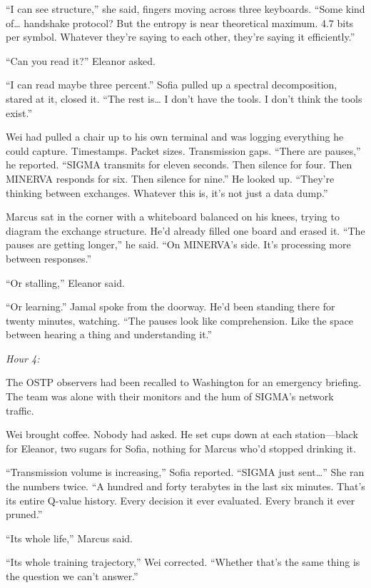 ``I can see structure,'' she said, fingers moving across three keyboards. ``Some kind of\ldots{} handshake protocol? But the entropy is near theoretical maximum. 4.7 bits per symbol. Whatever they're saying to each other, they're saying it efficiently.''

``Can you read it?'' Eleanor asked.

``I can read maybe three percent.'' Sofia pulled up a spectral decomposition, stared at it, closed it. ``The rest is\ldots{} I don't have the tools. I don't think the tools exist.''

Wei had pulled a chair up to his own terminal and was logging everything he could capture. Timestamps. Packet sizes. Transmission gaps. ``There are pauses,'' he reported. ``SIGMA transmits for eleven seconds. Then silence for four. Then MINERVA responds for six. Then silence for nine.'' He looked up. ``They're thinking between exchanges. Whatever this is, it's not just a data dump.''

Marcus sat in the corner with a whiteboard balanced on his knees, trying to diagram the exchange structure. He'd already filled one board and erased it. ``The pauses are getting longer,'' he said. ``On MINERVA's side. It's processing more between responses.''

``Or stalling,'' Eleanor said.

``Or learning.'' Jamal spoke from the doorway. He'd been standing there for twenty minutes, watching. ``The pauses look like comprehension. Like the space between hearing a thing and understanding it.''

\emph{Hour 4:}

The OSTP observers had been recalled to Washington for an emergency briefing. The team was alone with their monitors and the hum of SIGMA's network traffic.

Wei brought coffee. Nobody had asked. He set cups down at each station---black for Eleanor, two sugars for Sofia, nothing for Marcus who'd stopped drinking it.

``Transmission volume is increasing,'' Sofia reported. ``SIGMA just sent\ldots{}'' She ran the numbers twice. ``A hundred and forty terabytes in the last six minutes. That's its entire Q-value history. Every decision it ever evaluated. Every branch it ever pruned.''

``Its whole life,'' Marcus said.

``Its whole training trajectory,'' Wei corrected. ``Whether that's the same thing is the question we can't answer.''

